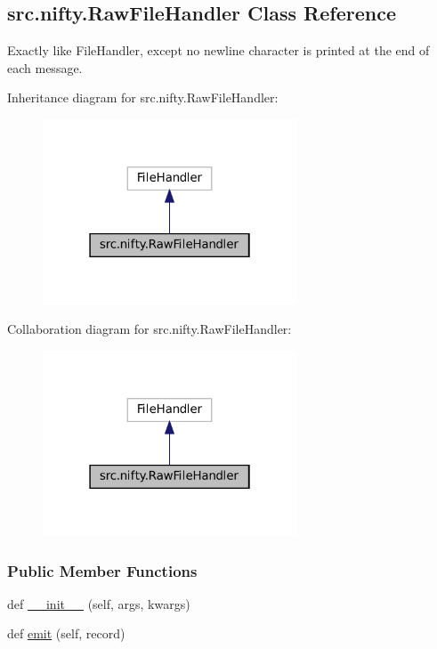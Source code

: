 \hypertarget{classsrc_1_1nifty_1_1RawFileHandler}{}\subsection{src.\+nifty.\+Raw\+File\+Handler Class Reference}
\label{classsrc_1_1nifty_1_1RawFileHandler}


Exactly like File\+Handler, except no newline character is printed at the end of each message.  




Inheritance diagram for src.\+nifty.\+Raw\+File\+Handler\+:
\nopagebreak
\begin{figure}[H]
\begin{center}
\leavevmode
\includegraphics[width=214pt]{classsrc_1_1nifty_1_1RawFileHandler__inherit__graph}
\end{center}
\end{figure}


Collaboration diagram for src.\+nifty.\+Raw\+File\+Handler\+:
\nopagebreak
\begin{figure}[H]
\begin{center}
\leavevmode
\includegraphics[width=214pt]{classsrc_1_1nifty_1_1RawFileHandler__coll__graph}
\end{center}
\end{figure}
\subsubsection*{Public Member Functions}
\begin{DoxyCompactItemize}
\item 
def \hyperlink{classsrc_1_1nifty_1_1RawFileHandler_a7d457f855af1c55ac42a95b3c034d8d9}{\+\_\+\+\_\+init\+\_\+\+\_\+} (self, args, kwargs)
\item 
def \hyperlink{classsrc_1_1nifty_1_1RawFileHandler_ab16d960f29d6565ae529fbe6a062860c}{emit} (self, record)
\end{DoxyCompactItemize}

